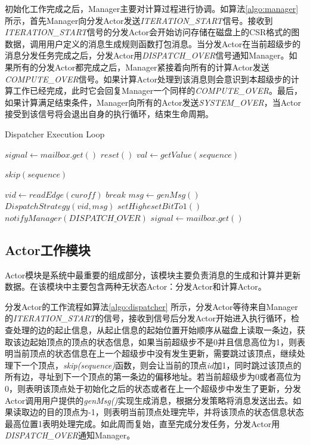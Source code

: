 初始化工作完成之后，Manager主要对计算过程进行协调。如算法\ref{algo:manager}所示，首先Manager向分发Actor发送\textit{ITERATION\_START}信号。接收到\textit{ITERATION\_START}信号的分发Actor会开始访问存储在磁盘上的CSR格式的图数据，调用用户定义的消息生成规则函数打包消息。当分发Actor在当前超级步的消息分发任务完成之后，分发Actor用\textit{DISPATCH\_OVER}信号通知Manager。如果所有的分发Actor都完成之后，Manager紧接着向所有的计算Actor发送\textit{COMPUTE\_OVER}信号。如果计算Actor处理到该消息则会意识到本超级步的计算工作已经完成，此时它会回复Manager一个同样的\textit{COMPUTE\_OVER}。最后，如果计算满足结束条件，Manager向所有的Actor发送\textit{SYSTEM\_OVER}，当Actor接受到该信号将会退出自身的执行循环，结束生命周期。
\vspace{0.5em}
\begin{algorithm}
{
{
\renewcommand\baselinestretch{1.2}\selectfont %
\caption{Dispatcher Execution Loop}
\label{algo:dispatcher}
\begin{algorithmic}[1]
\STATE
 $signal \leftarrow mailbox.get()$
\STATE $ reset() $
\STATE $val \leftarrow getValue(sequence)$

\STATE $skip(sequence)$
\ENDIF

\STATE $vid \leftarrow readEdge(curoff)$
\STATE $break$
\ENDIF
\STATE $msg \leftarrow genMsg()$
\STATE $DispatchStrategy(vid,msg)$
\ENDWHILE
\STATE $setHighesetBitTo1()$
\ENDIF
\ENDWHILE
\ENDIF
\STATE $notifyManager(DISPATCH\_OVER)$
\STATE $signal \leftarrow mailbox.get()$
\ENDWHILE

\end{algorithmic}
}
\par}
\end{algorithm}

\subsection{Actor工作模块}
Actor模块是系统中最重要的组成部分，该模块主要负责消息的生成和计算并更新数据。在该模块中主要包含两种无状态Actor：分发Actor和计算Actor。

分发Actor的工作流程如算法\ref{algo:dispatcher} 所示，分发Actor等待来自Manager的\textit{ITERATION\_START}的信号，接收到信号后分发Actor开始进入执行循环，检查处理的边的起止信息，从起止信息的起始位置开始顺序从磁盘上读取一条边，获取该边起始顶点的顶点的状态信息，如果当前超级步不是0并且信息高位为1，则表明当前顶点的状态信息在上一个超级步中没有发生更新，需要跳过该顶点，继续处理下一个顶点，\textit{skip(sequence)}函数，则会让当前的顶点\textit{id}加1，同时跳过该顶点的所有边，寻址到下一个顶点的第一条边的偏移地址。若当前超级步为0或者高位为0，则表明该顶点处于初始化之后的状态或者在上一个超级步中发生了更新，分发Actor调用用户提供的\textit{genMsg()}实现生成消息，根据分发策略将消息发送出去。如果读取边的目的顶点为-1，则表明当前顶点处理完毕，并将该顶点的状态信息状态最高位置1表明处理完成。如此周而复始，直至完成分发任务，分发Actor用\textit{DISPATCH\_OVER}通知Manager。

